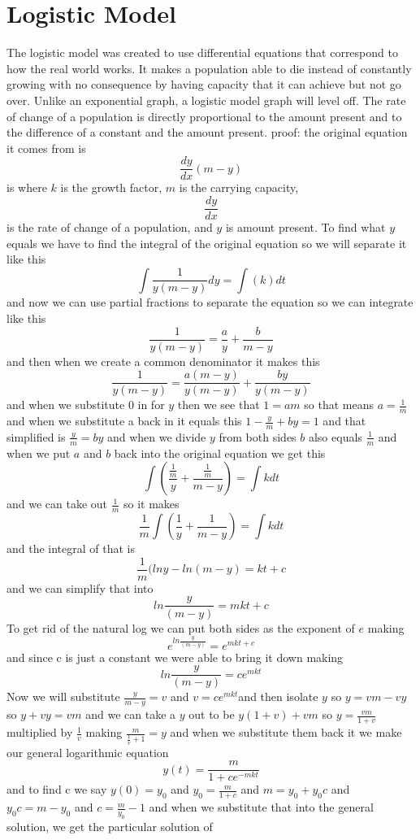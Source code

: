 \documentclass[a4paper,openright, 10pt]{article}
\begin{document}
 \section*{Logistic Model}
 The logistic model was created to use differential equations that correspond to how the real world works. It makes a population able to die instead of constantly growing with no consequence by having capacity that it can achieve but not go over. Unlike an exponential graph, a logistic model graph will level off.
 The rate of change of a population is directly proportional to the amount present and to the difference of a constant and the amount present.
 proof: the original equation it comes from is $$\frac{dy}{dx}(m-y)$$ is where $k$ is the growth factor, $m$ is the carrying capacity, $$\frac{dy}{dx}$$ is the rate of change of a population, and $y$ is amount present.
 To find what $y$ equals we have to find the integral of the original equation so we will separate it like this 
 $$\int\frac{1}{y(m-y)}dy=\int(k)dt$$
 and now we can use partial fractions to separate the equation so we can integrate like this 
 $$\frac{1}{y(m-y)}=\frac{a}{y}+\frac{b}{m-y}$$
 and then when we create a common denominator it makes this
 $$\frac{1}{y(m-y)}=\frac{a(m-y)}{y(m-y)}+\frac{by}{y(m-y)}$$
 and when we substitute $0$ in for $y$ then we see that $1=am$ so that means $a=\frac{1}{m}$ and when we substitute a back in it equals this
 $1-\frac{y}{m}+by=1$ and that simplified is $\frac{y}{m}=by$ and when we divide $y$ from both sides $b$ also equals $\frac{1}{m}$ and when we put $a$ and $b$ back into the original equation we get this
 $$\int(\frac{\frac{1}{m}}{y}+\frac{\frac{1}{m}}{m-y})=\int kdt $$
 and we can take out $\frac{1}{m}$ so it makes
  $$\frac{1}{m}\int(\frac{1}{y}+\frac{1}{m-y})=\int kdt $$
  and the integral of that is $$\frac{1}{m}(lny-ln(m-y)=kt+c$$
  and we can simplify that into
  $$ln\frac{y}{(m-y)}=mkt+c$$
  To get rid of the natural log we can put both sides as the exponent of $e$ making
  $$e^{ln\frac{y}{(m-y)}}=e^{mkt+c}$$
  and since c is just a constant we were able to bring it down making
  $$ln\frac{y}{(m-y)}=ce^{mkt}$$
  Now we will substitute $\frac{y}{m-y}=v$ and $v=ce^{mkt}$and then isolate $y$ so $y=vm-vy$ so $y+vy=vm$ and we can take a $y$ out to be $y(1+v)+vm$ so $y=\frac{vm}{1+v}$ multiplied by $\frac{1}{v}$ making $\frac{m}{\frac{1}{v}+1}=y$
  and when we substitute them back it we make our  general logarithmic equation $$y(t)=\frac{m}{1+ce^{-mkt}}$$
  and to find c we say $y(0)=y_0$
  and $y_0=\frac{m}{1+c}$ and $m=y_0+y_0c$ and $y_0c=m-y_0$ and $c=\frac{m}{y_0}-1$ and when we substitute that into the general solution, we get the particular solution of 
\end{document}
